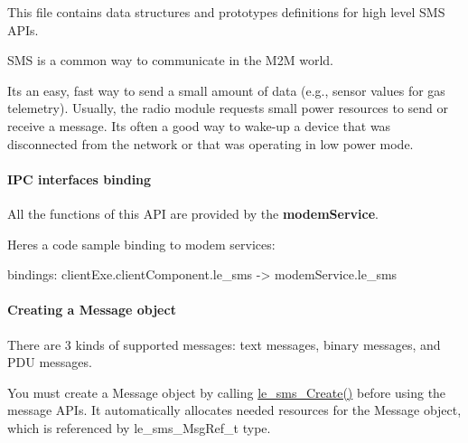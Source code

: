 This file contains data structures and prototypes definitions for high level S\+MS A\+P\+Is.

S\+MS is a common way to communicate in the M2M world.

It\textquotesingle{}s an easy, fast way to send a small amount of data (e.\+g., sensor values for gas telemetry). Usually, the radio module requests small power resources to send or receive a message. It\textquotesingle{}s often a good way to wake-\/up a device that was disconnected from the network or that was operating in low power mode.\hypertarget{c_sms_le_sms_binding}{}\paragraph{I\+P\+C interfaces binding}\label{c_sms_le_sms_binding}
All the functions of this A\+PI are provided by the {\bfseries modem\+Service}.

Here\textquotesingle{}s a code sample binding to modem services\+: \begin{DoxyVerb}bindings:
{
   clientExe.clientComponent.le_sms -> modemService.le_sms
}
\end{DoxyVerb}
\hypertarget{c_sms_le_sms_ops_creating_msg}{}\paragraph{Creating a Message object}\label{c_sms_le_sms_ops_creating_msg}
There are 3 kinds of supported messages\+: text messages, binary messages, and P\+DU messages.

You must create a Message object by calling {\ttfamily \hyperlink{le__sms__interface_8h_a668abcbcff2f1f3c5cdf799315a81058}{le\+\_\+sms\+\_\+\+Create()}} before using the message A\+P\+Is. It automatically allocates needed resources for the Message object, which is referenced by {\ttfamily le\+\_\+sms\+\_\+\+Msg\+Ref\+\_\+t} type.

